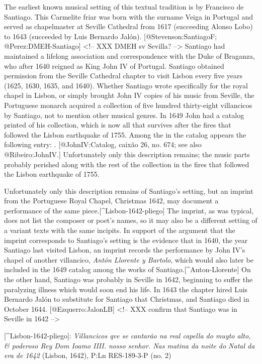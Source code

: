 The earliest known musical setting of this textual tradition is by Francisco de
Santiago.
This Carmelite friar was born with the surname Veiga in Portugal and
served as chapelmaster at Seville Cathedral from 1617 (succeeding Alonso Lobo)
to 1643 (succeeded by Luis Bernardo Jalón).
[@Stevenson:SantiagoF; @Perez:DMEH-Santiago]
<!-- XXX DMEH sv Sevilla? -->
Santiago had maintained a lifelong association and correspondence with the Duke
of Braganza, who after 1640 reigned as King John IV of Portugal.
Santiago obtained permission from the Seville Cathedral chapter to visit Lisbon
every five years (1625, 1630, 1635, and 1640).
Whether Santiago wrote specifically for the royal chapel in Lisbon, or
simply brought John IV copies of his music from Seville, the Portuguese monarch
acquired a collection of five hundred thirty-eight villancicos by Santiago, not
to mention other musical genres.
In 1649 John had a catalog printed of his collection, which is now all that
survives after the fires that followed the Lisbon earthquake of 1755.
Among the  in the catalog
appears the following entry:
. 
[@JohnIV:Catalog, caixão 26, no. 674; see also @Ribeiro:JohnIV.]
Unfortunately only this description remains; the music parts probably perished
along with the rest of the collection in the fires that followed the Lisbon
earthquake of 1755.

Unfortunately only this description remains of Santiago's setting, but an
imprint from the Portuguese Royal Chapel, Christmas 1642, may document a
performance of the same piece.[^Lisbon-1642-pliego] 
The imprint, as was typical, does not list the composer or poet's names, so it
may also be a different setting of a variant texts with the same incipits.
In support of the argument that the imprint corresponds to Santiago's setting is
the evidence that in 1640, the year Santiago last visited Lisbon, an imprint
records the performance by John IV's chapel of another villancico, \emph{Antón
Llorente y Bartolo}, which would also later be included in the 1649 catalog
among the works of Santiago.[^Anton-Llorente]
On the other hand, Santiago was probably in Seville in 1642, beginning to suffer
the paralyzing illness which would soon end his life.
In 1643 the chapter hired Luis Bernardo Jalón to substitute for Santiago that
Christmas, and Santiago died in October 1644.
[@Ezquerro:JalonLB]
<!-- XXX confirm that Santiago was in Seville in 1642 -->

[^Lisbon-1642-pliego]:
\emph{Villancicos qve se cantarão na real capella do muyto alto, \& poderoso Rey Dom
Ioamo IIII. nosso senhor. Nas matina da noite do Natal da era de 1642} (Lisbon,
1642), P:Ln RES-189-3-P (no. 2)

